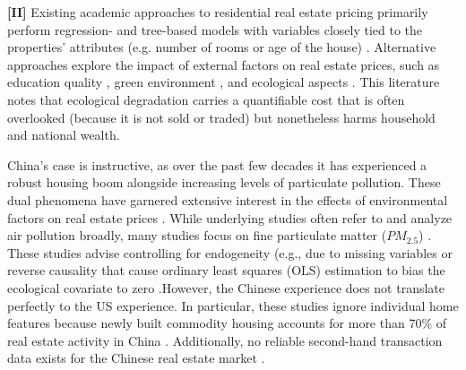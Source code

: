 \documentclass[sigconf,nonacm,11pt]{acmart}
\begin{document}
\textbf{[II]} Existing academic approaches to residential real estate pricing primarily perform regression- and tree-based models with variables closely tied to the properties' attributes (e.g. number of rooms or age of the house) \cite{Kim2003} \cite{Ceh2018} \cite{Manjuna2017}. Alternative approaches explore the impact of external factors on real estate prices, such as education quality \cite{Fleishman2017} \cite{Seo2009}, green environment \cite{Luttik2000}, and ecological aspects \cite{Boennec2017}. This literature notes that ecological degradation carries a quantifiable cost that is often overlooked (because it is not sold or traded) but nonetheless harms household and national wealth.



China's case is instructive, as over the past few decades it has experienced a robust housing boom alongside increasing levels of particulate pollution. These dual phenomena have garnered extensive interest in the effects of environmental factors on real estate prices \cite{Zheng2014} \cite{Mei2020}. While underlying studies often refer to and analyze air pollution broadly, many studies focus on fine particulate matter ($PM_{2.5 }$) \cite{Chen2017} \cite{Chen2019} \cite{Wang2021} \cite{Sun2020} \cite{Dai2020}. These studies advise controlling for endogeneity (e.g., due to missing variables or reverse causality
that cause ordinary least squares (OLS) estimation to bias the ecological covariate to zero \cite{Zheng2014} \cite{Chen2017} \cite{Chen2019}.\newline However, the Chinese experience does not translate perfectly to the US experience. In particular, these studies ignore individual home features because newly built commodity housing accounts for more than 70\% of real estate activity in China \cite{Chen2017}. Additionally, no reliable second-hand transaction data exists for the Chinese real estate market \cite{Zheng2014}.
\end{document}

